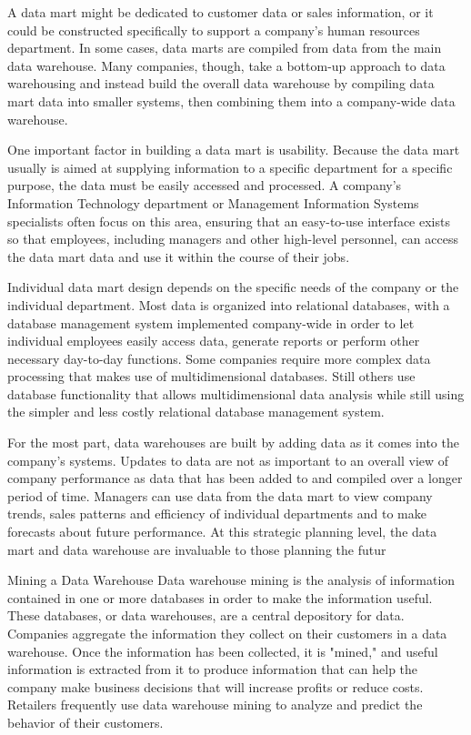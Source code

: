 A data mart might be dedicated to customer data or sales information, or it could be constructed specifically to support a company's human resources department. In some cases, data marts are compiled from data from the main data warehouse. Many companies, though, take a bottom-up approach to data warehousing and instead build the overall data warehouse by compiling data mart data into smaller systems, then combining them into a company-wide data warehouse.
 
One important factor in building a data mart is usability. Because the data mart usually is aimed at supplying information to a specific department for a specific purpose, the data must be easily accessed and processed. A company's Information Technology department or Management Information Systems specialists often focus on this area, ensuring that an easy-to-use interface exists so that employees, including managers and other high-level personnel, can access the data mart data and use it within the course of their jobs.
 
Individual data mart design depends on the specific needs of the company or the individual department. Most data is organized into relational databases, with a database management system implemented company-wide in order to let individual employees easily access data, generate reports or perform other necessary day-to-day functions. Some companies require more complex data processing that makes use of multidimensional databases. Still others use database functionality that allows multidimensional data analysis while still using the simpler and less costly relational database management system.
 
For the most part, data warehouses are built by adding data as it comes into the company's systems. Updates to data are not as important to an overall view of company performance as data that has been added to and compiled over a longer period of time. Managers can use data from the data mart to view company trends, sales patterns and efficiency of individual departments and to make forecasts about future performance. At this strategic planning level, the data mart and data warehouse are invaluable to those planning the futur
 
Mining a Data Warehouse
Data warehouse mining is the analysis of information contained in one or more databases in order to make the information useful. These databases, or data warehouses, are a central depository for data. Companies aggregate the information they collect on their customers in a data warehouse. Once the information has been collected, it is "mined," and useful information is extracted from it to produce information that can help the company make business decisions that will increase profits or reduce costs. Retailers frequently use data warehouse mining to analyze and predict the behavior of their customers.
 
